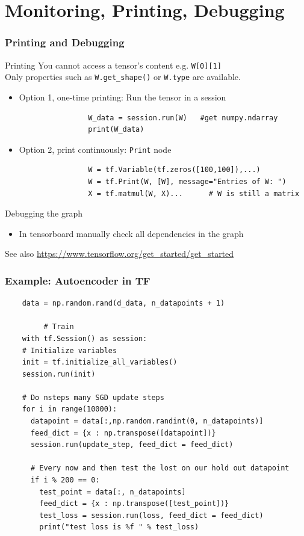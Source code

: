 \documentclass[mathserif]{beamer}
\begin{document}
\section{Monitoring, Printing, Debugging}

\begin{frame}[fragile]
	\frametitle{Printing and Debugging}
	\begin{block}{Printing}
		You cannot access a tensor's content e.g. \texttt{W[0][1]}\\
		Only properties such as \texttt{W.get\_shape()} or \texttt{W.type} are available.
		\begin{itemize}		
			\item Option 1, one-time printing: Run the tensor in a session
			\begin{verbatim}
				W_data = session.run(W)   #get numpy.ndarray
				print(W_data) 
			\end{verbatim}
			\item Option 2, print continuously: \texttt{Print} node
			\begin{verbatim}
				W = tf.Variable(tf.zeros([100,100]),...)
				W = tf.Print(W, [W], message="Entries of W: ")
				X = tf.matmul(W, X)...		# W is still a matrix
			\end{verbatim}
		\end{itemize}
	\end{block}
	


	\begin{block}{Debugging the graph}
		\begin{itemize}
			\item In tensorboard manually check all dependencies in the graph
		\end{itemize}
	\end{block}
	
	See also \url{https://www.tensorflow.org/get\_started/get\_started}
\end{frame}

\begin{frame}[fragile]
	\frametitle{Example: Autoencoder in TF}
	\begin{verbatim}
    data = np.random.rand(d_data, n_datapoints + 1) 
  	
  		 # Train
  	with tf.Session() as session:
    # Initialize variables
    init = tf.initialize_all_variables() 
    session.run(init)
    
    # Do nsteps many SGD update steps
    for i in range(10000):
      datapoint = data[:,np.random.randint(0, n_datapoints)]
      feed_dict = {x : np.transpose([datapoint])}
      session.run(update_step, feed_dict = feed_dict)
      
      # Every now and then test the lost on our hold out datapoint 
      if i % 200 == 0:
        test_point = data[:, n_datapoints]
        feed_dict = {x : np.transpose([test_point])}
        test_loss = session.run(loss, feed_dict = feed_dict)
        print("test loss is %f " % test_loss)

  	\end{verbatim}
\end{frame}
\end{document}
